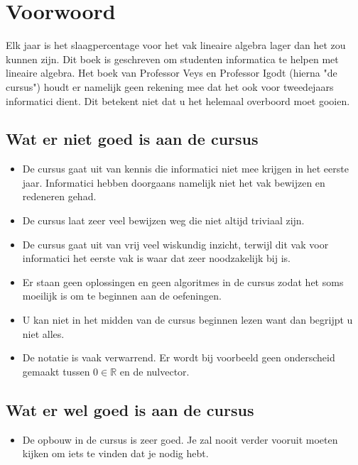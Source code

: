 \documentclass[lineaire_algebra_oplossingen.tex]{subfiles}
\begin{document}
\newpage
\section*{Voorwoord}
Elk jaar is het slaagpercentage voor het vak lineaire algebra lager dan het zou kunnen zijn. Dit boek is geschreven om studenten informatica te helpen met lineaire algebra. Het boek van Professor Veys en Professor Igodt (hierna "de cursus") houdt er namelijk geen rekening mee dat het ook voor tweedejaars informatici dient. Dit betekent niet dat u het helemaal overboord moet gooien.

\subsection*{Wat er niet goed is aan de cursus}
\begin{itemize}
\item De cursus gaat uit van kennis die informatici niet mee krijgen in het eerste jaar. Informatici hebben doorgaans namelijk niet het vak bewijzen en redeneren gehad.
\item De cursus laat zeer veel bewijzen weg die niet altijd triviaal zijn.
\item De cursus gaat uit van vrij veel wiskundig inzicht, terwijl dit vak voor informatici het eerste vak is waar dat zeer noodzakelijk bij is.
\item Er staan geen oplossingen en geen algoritmes in de cursus zodat het soms moeilijk is om te beginnen aan de oefeningen.
\item U kan niet in het midden van de cursus beginnen lezen want dan begrijpt u niet alles.
\item De notatie is vaak verwarrend. Er wordt bij voorbeeld geen onderscheid gemaakt tussen $0\in \mathbb{R}$ en de nulvector.
\end{itemize}
\subsection*{Wat er wel goed is aan de cursus}
\begin{itemize}
\item De opbouw in de cursus is zeer goed. Je zal nooit verder vooruit moeten kijken om iets te vinden dat je nodig hebt.
\end{itemize}
\end{document}
